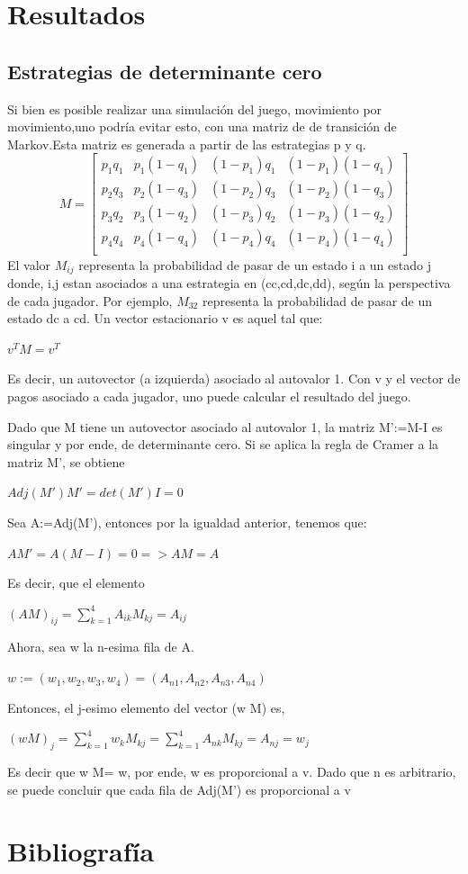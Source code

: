 \documentclass[12pt]{article}
\begin{document}
\section{Resultados}
\subsection{Estrategias de determinante cero}
Si bien es posible realizar una simulación del juego, movimiento por movimiento,uno podría evitar esto, con una matriz de
de transición de Markov.Esta matriz es generada a partir de las estrategias p y q.
$$M=
\begin{bmatrix}
 p_1 q_1 &p_1(1-q_1) &(1-p_1)q_1 &(1-p_1)(1-q_1)\\
 p_2 q_3 &p_2(1-q_3) &(1-p_2)q_3 &(1-p_2)(1-q_3)\\
 p_3 q_2 &p_3(1-q_2) &(1-p_3)q_2 &(1-p_3)(1-q_2)\\
 p_4 q_4 &p_4(1-q_4) &(1-p_4)q_4 &(1-p_4)(1-q_4)\\
\end{bmatrix}
$$
El valor $M_{ij}$ representa la probabilidad de pasar de un estado i a un estado j donde, i,j estan asociados a una 
estrategia en (cc,cd,dc,dd), según la perspectiva de cada jugador.
Por ejemplo, $M_{32}$ representa la probabilidad de pasar de un estado dc a cd.
Un vector estacionario v es aquel tal que:
\begin{center}
$v^T M = v^T$
\end{center}
Es decir, un autovector (a izquierda) asociado al autovalor 1.
Con v y el vector de pagos asociado a cada jugador, uno puede calcular el resultado del juego.

Dado que M tiene un autovector asociado al autovalor 1, la matriz M':=M-I es singular y por ende, de 
determinante cero.
Si se aplica la regla de Cramer a la matriz M', se obtiene
\begin{center}
$Adj(M')M' = det(M')I=0$
\end{center}
Sea A:=Adj(M'), entonces por la igualdad anterior, tenemos que:
\begin{center}
$AM'=A(M-I)=0 => AM=A$
\end{center}
Es decir, que el elemento 
\begin{center}
$(AM)_{ij}=\sum_{k=1}^4 A_{ik} M_{kj} = A_{ij}$
\end{center}
Ahora, sea w la n-esima fila de A.
\begin{center}
$w:=(w_1,w_2,w_3,w_4)=(A_{n1},A_{n2},A_{n3},A_{n4})$
\end{center}
Entonces, el j-esimo elemento del vector (w M) es,
\begin{center}
$(w M)_j=\sum_{k=1}^4 w_k M_{kj} =\sum_{k=1}^4 A_{nk} M_{kj} = A_{nj}=w_j$
\end{center}
Es decir que w M= w, por ende, w es proporcional a v.
Dado que n es arbitrario, se puede concluir que cada fila de Adj(M') es proporcional a v

 \section{Bibliografía}
  \begin{thebibliography}{1}
  \end{thebibliography}
\end{document}
